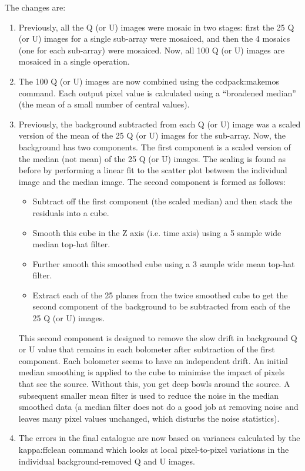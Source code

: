 \documentclass[twoside,11pt]{starlink}
\begin{document}
The changes are:
\begin{enumerate}
\item Previously, all the Q (or U) images were mosaic in two stages: first
the 25 Q (or U) images for a single sub-array were mosaiced, and then the
4 mosaics (one for each sub-array) were mosaiced. Now, all 100 Q (or U)
images are mosaiced in a single operation.
\item The 100 Q (or U) images are now combined using the ccdpack:makemos
command. Each output pixel value is calculated using a “broadened
median” (the mean of a small number of central values).
\item Previously, the background subtracted from each Q (or U) image was a
scaled version of the mean of the 25 Q (or U) images for the sub-array.
Now, the background has two components. The first component is a scaled
version of the median (not mean) of the 25 Q (or U) images. The scaling
is found as before by performing a linear fit to the scatter plot between
the individual image and the median image. The second component is formed
as follows:
\begin{itemize}
\item Subtract off the first component (the scaled median) and then stack the
residuals into a cube.
\item Smooth this cube in the Z axis (i.e. time axis) using a 5 sample wide
median top-hat filter.
\item Further smooth this smoothed cube using a 3 sample wide mean top-hat
filter.
\item Extract each of the 25 planes from the twice smoothed cube to get the
second component of the background to be subtracted from each of the 25 Q
(or U) images.
\end{itemize}
This second component is designed to remove the slow drift in background
Q or U value that remains in each bolometer after subtraction of the
first component. Each bolometer seems to have an independent drift. An
initial median smoothing is applied to the cube to minimise the impact of
pixels that see the source. Without this, you get deep bowls around the
source. A subsequent smaller mean filter is used to reduce the noise in
the median smoothed data (a median filter does not do a good job at
removing noise and leaves many pixel values unchanged, which disturbs the
noise statistics).
\item The errors in the final catalogue are now based on variances
calculated by the kappa:ffclean command which looks at local
pixel-to-pixel variations in the individual background-removed Q and U
images.

\end{enumerate}
\end{document}
